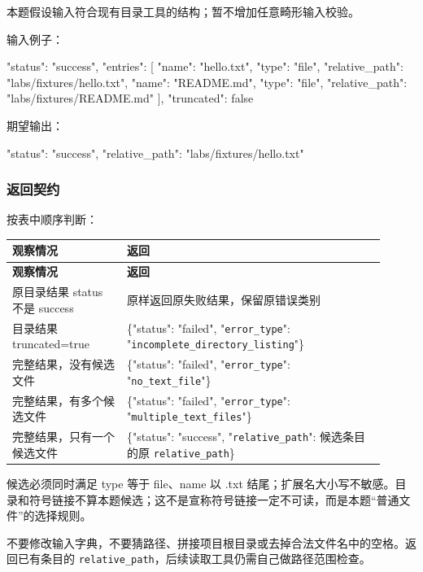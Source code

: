 \documentclass[UTF8,zihao=-4,fontset=fandol]{ctexart}
\begin{document}
本题假设输入符合现有目录工具的结构；暂不增加任意畸形输入校验。

输入例子：

\begin{Code}
{
  "status": "success",
  "entries": [
    {"name": "hello.txt", "type": "file", "relative_path": "labs/fixtures/hello.txt"},
    {"name": "README.md", "type": "file", "relative_path": "labs/fixtures/README.md"}
  ],
  "truncated": false
}
\end{Code}

期望输出：

\begin{Code}
{"status": "success", "relative_path": "labs/fixtures/hello.txt"}
\end{Code}

\subsubsection{返回契约}

按表中顺序判断：

{\small\setlength{\tabcolsep}{4pt}
\renewcommand{\arraystretch}{1.25}
\begin{longtable}{>{\raggedright\arraybackslash}p{0.28\linewidth}>{\raggedright\arraybackslash}p{0.63\linewidth}}
\toprule
\textbf{观察情况} & \textbf{返回} \\
\midrule\endfirsthead
\toprule
\textbf{观察情况} & \textbf{返回} \\
\midrule\endhead
\bottomrule\endfoot
原目录结果 status 不是 success & 原样返回原失败结果，保留原错误类别 \\
目录结果 truncated=true & \{"status": "failed", "\nolinkurl{error_type}": "\nolinkurl{incomplete_directory_listing}"\} \\
完整结果，没有候选文件 & \{"status": "failed", "\nolinkurl{error_type}": "\nolinkurl{no_text_file}"\} \\
完整结果，有多个候选文件 & \{"status": "failed", "\nolinkurl{error_type}": "\nolinkurl{multiple_text_files}"\} \\
完整结果，只有一个候选文件 & \{"status": "success", "\nolinkurl{relative_path}": 候选条目的原 \nolinkurl{relative_path}\} \\
\end{longtable}}

候选必须同时满足 type 等于 file、name 以 .txt 结尾；扩展名大小写不敏感。目录和符号链接不算本题候选；这不是宣称符号链接一定不可读，而是本题“普通文件”的选择规则。

不要修改输入字典，不要猜路径、拼接项目根目录或去掉合法文件名中的空格。返回已有条目的 \nolinkurl{relative_path}，后续读取工具仍需自己做路径范围检查。
\end{document}

